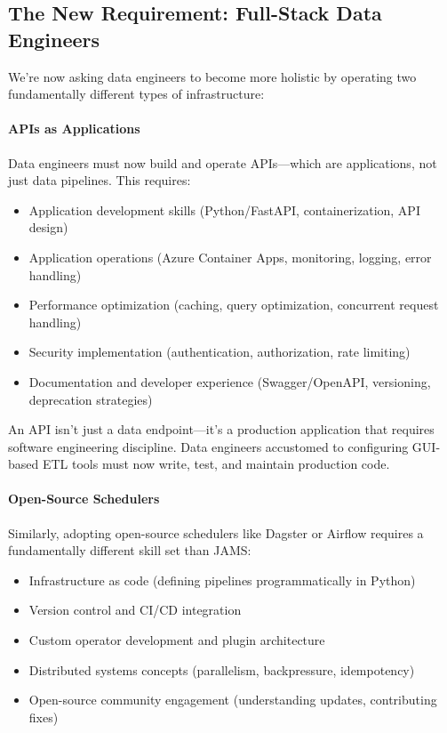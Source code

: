 \documentclass[12pt, a4paper]{article}
\begin{document}
\subsection{The New Requirement: Full-Stack Data Engineers}

We're now asking data engineers to become more holistic by operating two fundamentally different types of infrastructure:

\paragraph{APIs as Applications}
Data engineers must now build and operate APIs—which are applications, not just data pipelines. This requires:

\begin{itemize}[leftmargin=*, nosep]
    \item Application development skills (Python/FastAPI, containerization, API design)
    \item Application operations (Azure Container Apps, monitoring, logging, error handling)
    \item Performance optimization (caching, query optimization, concurrent request handling)
    \item Security implementation (authentication, authorization, rate limiting)
    \item Documentation and developer experience (Swagger/OpenAPI, versioning, deprecation strategies)
\end{itemize}

An API isn't just a data endpoint—it's a production application that requires software engineering discipline. Data engineers accustomed to configuring GUI-based ETL tools must now write, test, and maintain production code.

\paragraph{Open-Source Schedulers}
Similarly, adopting open-source schedulers like Dagster or Airflow requires a fundamentally different skill set than JAMS:

\begin{itemize}[leftmargin=*, nosep]
    \item Infrastructure as code (defining pipelines programmatically in Python)
    \item Version control and CI/CD integration
    \item Custom operator development and plugin architecture
    \item Distributed systems concepts (parallelism, backpressure, idempotency)
    \item Open-source community engagement (understanding updates, contributing fixes)
\end{itemize}
\end{document}
